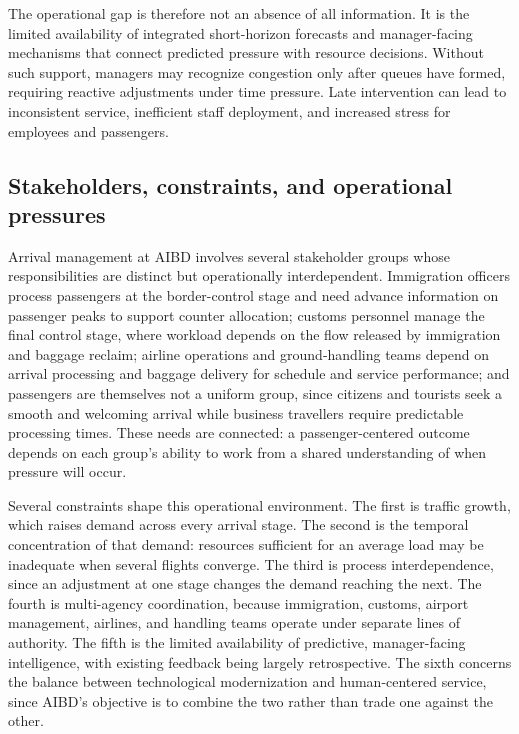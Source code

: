 The operational gap is therefore not an absence of all information. It is the limited availability of integrated short-horizon forecasts and manager-facing mechanisms that connect predicted pressure with resource decisions. Without such support, managers may recognize congestion only after queues have formed, requiring reactive adjustments under time pressure. Late intervention can lead to inconsistent service, inefficient staff deployment, and increased stress for employees and passengers.

\subsection{Stakeholders, constraints, and operational pressures}
\label{subsec:stakeholders-constraints-operational-pressures}

Arrival management at AIBD involves several stakeholder groups whose responsibilities are distinct but operationally interdependent. Immigration officers process passengers at the border-control stage and need advance information on passenger peaks to support counter allocation; customs personnel manage the final control stage, where workload depends on the flow released by immigration and baggage reclaim; airline operations and ground-handling teams depend on arrival processing and baggage delivery for schedule and service performance; and passengers are themselves not a uniform group, since citizens and tourists seek a smooth and welcoming arrival while business travellers require predictable processing times. These needs are connected: a passenger-centered outcome depends on each group's ability to work from a shared understanding of when pressure will occur.

Several constraints shape this operational environment. The first is traffic growth, which raises demand across every arrival stage. The second is the temporal concentration of that demand: resources sufficient for an average load may be inadequate when several flights converge. The third is process interdependence, since an adjustment at one stage changes the demand reaching the next. The fourth is multi-agency coordination, because immigration, customs, airport management, airlines, and handling teams operate under separate lines of authority. The fifth is the limited availability of predictive, manager-facing intelligence, with existing feedback being largely retrospective. The sixth concerns the balance between technological modernization and human-centered service, since AIBD's objective is to combine the two rather than trade one against the other.

